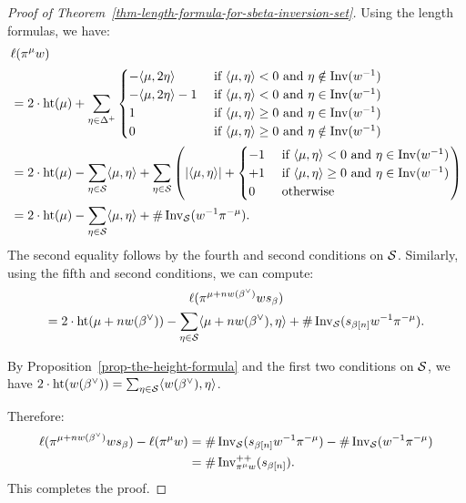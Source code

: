\documentclass[10pt]{amsart}
\newcommand{\textif}{\text{ if }}\newcommand{\textand}{\text{ and }}\newcommand{\textor}{\text{ or }}\newcommand{\suchthat}{\mid}
\begin{document}
\begin{proof}[Proof of Theorem~\ref{thm-length-formula-for-sbeta-inversion-set}]
Using the length formulas, we have:
\begin{align*}
&\ell(\pi^\mu w)\\ &= 2 \cdot \height(\mu) + \sum_{\eta \in\Delta^+}
\begin{cases}
- \langle \mu, 2 \eta \rangle & \textif \langle \mu, \eta \rangle < 0 \textand \eta \notin \Inv(w^{-1}) \\
- \langle \mu, 2 \eta \rangle -1 & \textif \langle \mu, \eta \rangle < 0 \textand \eta \in \Inv(w^{-1}) \\
1 & \textif \langle \mu, \eta \rangle \geq 0 \textand \eta \in \Inv(w^{-1}) \\
0 & \textif \langle \mu, \eta \rangle \geq 0 \textand \eta \notin \Inv(w^{-1})
\end{cases} \\
&= 2 \cdot \height(\mu) - \sum_{\eta \in \cS} \langle \mu, \eta \rangle +
\sum_{\eta \in \cS} \left(|\langle \mu, \eta \rangle| +
\begin{cases}
-1 & \textif \langle \mu, \eta \rangle < 0 \textand \eta \in \Inv(w^{-1}) \\
+1 & \textif \langle \mu, \eta \rangle \geq 0 \textand \eta \in \Inv(w^{-1}) \\
0 & \text{ otherwise}
\end{cases}
\right) \\
&= 2 \cdot \height(\mu) - \sum_{\eta \in \cS} \langle \mu, \eta \rangle + \# \Inv_{\cS}(w^{-1} \pi^{-\mu}).
\end{align*}
The second equality follows by the fourth and second conditions on $\mathcal{S}$. Similarly, using the fifth and second conditions, we can compute:
\begin{multline}\label{eq:65H}
\ell(\pi^{\mu + n w(\betacheck)} w s_\beta)\\
 = 2 \cdot \height(\mu + n w(\betacheck)) - \sum_{\eta \in \cS}\langle \mu + n w(\betacheck), \eta \rangle + \# \Inv_{\cS}(s_{\beta[n]} w^{-1} \pi^{-\mu}).
\end{multline}

By Proposition~\ref{prop-the-height-formula} and the first two conditions on $\mathcal{S}$, we have $2 \cdot \operatorname{ht}(w(\beta^\vee)) = \sum_{\eta \in \mathcal{S}} \langle w(\beta^\vee), \eta \rangle$.

Therefore:
\begin{align*}
\ell(\pi^{\mu + n w(\beta^\vee)} w s_\beta) - \ell(\pi^\mu w) &= \# \operatorname{Inv}_{\mathcal{S}}(s_{\beta[n]}w^{-1} \pi^{-\mu}) - \# \operatorname{Inv}_{\mathcal{S}}(w^{-1} \pi^{-\mu})\\
&= \# \operatorname{Inv}^{++}_{\pi^\mu w} (s_{\beta[n]}).
\end{align*}
This completes the proof.
\end{proof}
\end{document}
